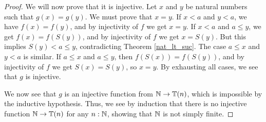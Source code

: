 \documentclass[../math.tex]{subfiles}
\begin{document}
\begin{proof}
    We will now prove that it is injective.  Let $x$ and $y$ be natural numbers
    such that $g(x) = g(y)$.  We must prove that $x = y$.  If $x < a$ and $y <
    a$, we have $f(x) = f(y)$, and by injectivity of $f$ we get $x = y$.  If $x
    < a$ and $a \leq y$, we get $f(x) = f(S(y))$, and by injectivity of $f$ we
    get $x = S(y)$.  But this implies $S(y) < a \leq y$, contradicting Theorem
    \ref{nat_lt_suc}.  The case $a \leq x$ and $y < a$ is similar.  If $a \leq
    x$ and $a \leq y$, then $f(S(x)) = f(S(y))$, and by injectivity of $f$ we
    get $S(x) = S(y)$, so $x = y$.  By exhausting all cases, we see that $g$ is
    injective.

    We now see that $g$ is an injective function from $\mathbb{N} \to \mathbb{T}(n)$, which is
    impossible by the inductive hypothesis.  Thus, we see by induction that
    there is no injective function $\mathbb{N} \to \mathbb{T}(n)$ for any $n : \mathbb{N}$, showing that
    $\mathbb{N}$ is not simply finite.
\end{proof}
\end{document}
